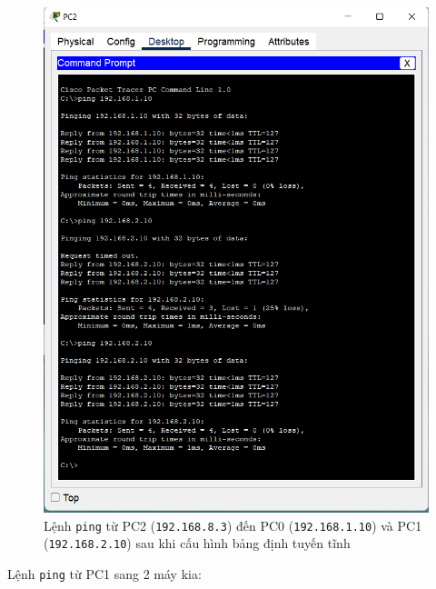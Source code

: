 \begin{enumerate}
\begin{figure}[H]
\begin{center}
\includegraphics[scale=1]{../figures/p1/p1-72}
\end{center}
\caption{Lệnh \texttt{ping} từ PC2 (\texttt{192.168.8.3}) đến PC0 (\texttt{192.168.1.10}) và PC1 (\texttt{192.168.2.10}) sau khi cấu hình bảng định tuyến tĩnh}
\end{figure}

Lệnh \texttt{ping} từ PC1 sang 2 máy kia:


\end{enumerate}
